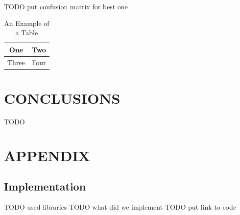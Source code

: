 \documentclass[letterpaper, 10 pt, conference]{ieeeconf}  %
\begin{document}
TODO put confusion matrix for best one

\begin{table}[h]
\caption{An Example of a Table}
\label{table_example}
\begin{center}
\begin{tabular}{|c||c|}
\hline
One & Two\\
\hline
Three & Four\\
\hline
\end{tabular}
\end{center}
\end{table}


\section{CONCLUSIONS}
\label{sec:concl}
TODO

\addtolength{\textheight}{-12cm}   %







\section*{APPENDIX}
\label{sec:appendix}
\subsection{Implementation}
TODO used libraries
TODO what did we implement
TODO put link to code
\end{document}

